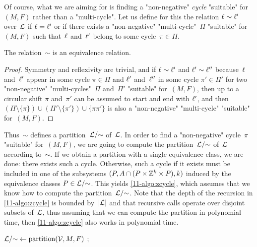 \begin{scope}
Of course, what we are aiming for is finding a "non-negative"
\emph{cycle} "suitable" for $(M,F)$ rather than a "multi-cycle".
Let us define for this the relation $\ell\sim\ell'$ over~$\mathcal L$ if
$\ell=\ell'$ or if there exists a "non-negative" "multi-cycle"~$\Pi$
"suitable" for~$(M,F)$ such that~$\ell$ and~$\ell'$ belong to some
cycle~$\pi\in\Pi$.
\begin{claim}\label{11-cl:sim} The relation~$\sim$ is an equivalence
  relation.\end{claim}
\begin{proof}
  Symmetry and reflexivity are trivial, and if $\ell\sim\ell'$ and
  $\ell'\sim\ell''$ because~$\ell$ and~$\ell'$ appear in some cycle
  $\pi\in\Pi$ and $\ell'$ and~$\ell''$ in some cycle $\pi'\in\Pi'$ for
  two "non-negative" "multi-cycles"~$\Pi$ and~$\Pi'$ "suitable"
  for~$(M,F)$, then up to a circular shift $\pi$ and~$\pi'$ can be
  assumed to start and end with $\ell'$, and then
  $(\Pi\setminus\{\pi\})\cup(\Pi'\setminus\{\pi'\})\cup\{\pi\pi'\}$ is
  also a "non-negative" "multi-cycle" "suitable" for~$(M,F)$.
\end{proof}

Thus~$\sim$ defines a partition~$\mathcal L/{\sim}$ of~$\mathcal L$.
In order to find a "non-negative" cycle~$\pi$ "suitable" for~$(M,F)$,
we are going to compute the partition~$\mathcal L/{\sim}$ of~$\mathcal L$
according to~$\sim$.  If we obtain a partition with a single
equivalence class, we are done: there exists such a cycle.  Otherwise,
such a cycle if it exists must be included in one of the subsystems
$(P,A\cap(P\times\mathbb Z^k\times P),k)$ induced by the equivalence
classes $P\in\mathcal L/{\sim}$.  This yields \cref{11-algo:zcycle}, which
assumes that we know how to compute the partition~$\mathcal L/{\sim}$.  Note
that the depth of the recursion in \cref{11-algo:zcycle} is bounded
by~$|\mathcal L|$ and that recursive calls operate over disjoint subsets
of~$\mathcal L$, thus assuming that we can compute the partition in
polynomial time, then \cref{11-algo:zcycle} also works in polynomial
time.

\begin{algorithm}

  {
    {}}

$\mathcal L/{\sim} \leftarrow \mathrm{partition}(\mathcal V,M,F)$ ;



\end{algorithm}
\end{scope}
